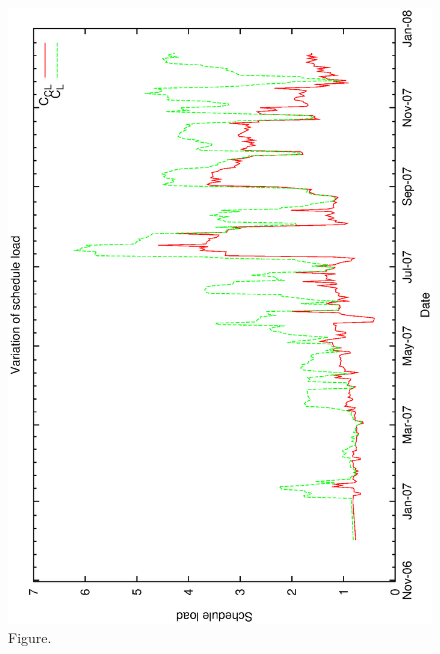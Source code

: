 \documentclass[12pt,a4paper]{article}
\begin{document}
\begin{figure}[htbp]
 \begin{center}
  \includegraphics[scale=1.0, angle=0]{figures/cl_load.eps}
 \end{center}
  \caption[Figure.]
{Figure.}
\end{figure}
\clearpage
\end{document}
